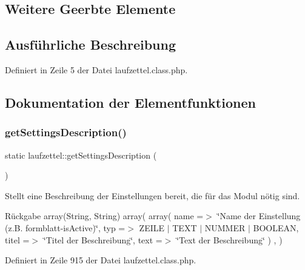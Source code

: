 \subsection*{Weitere Geerbte Elemente}


\subsection{Ausführliche Beschreibung}


Definiert in Zeile 5 der Datei laufzettel.\+class.\+php.



\subsection{Dokumentation der Elementfunktionen}
\mbox{\label{classlaufzettel_a15851011f57669b75b6577904652976f}} 
\subsubsection{\texorpdfstring{get\+Settings\+Description()}{getSettingsDescription()}}
{\footnotesize\ttfamily static laufzettel\+::get\+Settings\+Description (\begin{DoxyParamCaption}{ }\end{DoxyParamCaption})\hspace{0.3cm}{\ttfamily [static]}}

Stellt eine Beschreibung der Einstellungen bereit, die für das Modul nötig sind. \begin{DoxyReturn}{Rückgabe}
array(\+String, String) array( array( \textquotesingle{}name\textquotesingle{} =$>$ \char`\"{}\+Name der Einstellung (z.\+B. formblatt-\/is\+Active)\char`\"{}, \textquotesingle{}typ\textquotesingle{} =$>$ Z\+E\+I\+LE $\vert$ T\+E\+XT $\vert$ N\+U\+M\+M\+ER $\vert$ B\+O\+O\+L\+E\+AN, \textquotesingle{}titel\textquotesingle{} =$>$ \char`\"{}\+Titel der Beschreibung\char`\"{}, \textquotesingle{}text\textquotesingle{} =$>$ \char`\"{}\+Text der Beschreibung\char`\"{} ) , ) 
\end{DoxyReturn}


Definiert in Zeile 915 der Datei laufzettel.\+class.\+php.

\mbox{\label{classlaufzettel_afc3548e92fa7c720ac610f3e621436f7}} 
